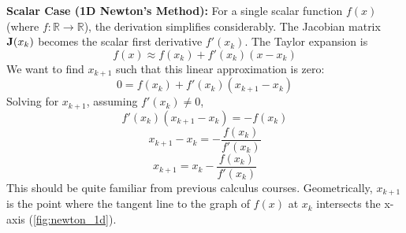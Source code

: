 \textbf{Scalar Case (1D Newton's Method):}
For a single scalar function $f(x)$ (where $f:\mathbb{R}\to\mathbb{R}$), the derivation simplifies considerably. The Jacobian matrix $\mathbf{J}(x_k)$ becomes the scalar first derivative $f'(x_k)$. The Taylor expansion is
\[
    f(x) \approx f(x_k) + f'(x_k)(x - x_k)
\]
We want to find $x_{k+1}$ such that this linear approximation is zero:
\[
    0 = f(x_k) + f'(x_k)(x_{k+1} - x_k)
\]
Solving for $x_{k+1}$, assuming $f'(x_k) \neq 0$,
\[
    f'(x_k)(x_{k+1} - x_k) = -f(x_k)
\]
\[
    x_{k+1} - x_k = -\frac{f(x_k)}{f'(x_k)}
\]
\[
    x_{k+1} = x_k - \frac{f(x_k)}{f'(x_k)}
\]
This should be quite familiar from previous calculus courses. Geometrically, $x_{k+1}$ is the point where the tangent line to the graph of $f(x)$ at $x_k$ intersects the x-axis (\autoref{fig:newton_1d}).

\begin{figure}[H]
    \centering
\end{figure}
